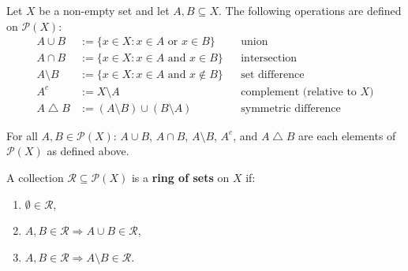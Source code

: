
\begin{tcolorbox}[colback=propbox, colframe=propborder, arc=2pt,
  left=6pt, right=6pt, top=4pt, bottom=4pt,
  title={\small\textbf{Definition (Set Operations)}},
  fonttitle=\small\bfseries]
\label{def:set-operations}
Let $X$ be a non-empty set and let $A, B \subseteq X$.  The
following operations are defined on $\mathcal{P}(X)$:
\begin{align*}
A \cup B      &:= \{ x \in X : x \in A \text{ or } x \in B \}
  && \text{union} \\
A \cap B      &:= \{ x \in X : x \in A \text{ and } x \in B \}
  && \text{intersection} \\
A \setminus B &:= \{ x \in X : x \in A \text{ and } x \notin B \}
  && \text{set difference} \\
A^c           &:= X \setminus A
  && \text{complement (relative to } X\text{)} \\
A \mathbin{\triangle} B
              &:= (A \setminus B) \cup (B \setminus A)
  && \text{symmetric difference}
\end{align*}
\end{tcolorbox}

\begin{remark*}
For all $A, B \in \mathcal{P}(X)$: $A \cup B$, $A \cap B$,
$A \setminus B$, $A^c$, and $A \mathbin{\triangle} B$ are each
elements of $\mathcal{P}(X)$ as defined above.
\end{remark*}

\begin{remark*}[Flash]
\end{remark*}

\begin{tcolorbox}[colback=propbox, colframe=propborder, arc=2pt,
  left=6pt, right=6pt, top=4pt, bottom=4pt,
  title={\small\textbf{Definition (Ring of Sets)}},
  fonttitle=\small\bfseries]
\label{def:ring-of-sets}
A collection $\mathcal{R} \subseteq \mathcal{P}(X)$ is a
\textbf{ring of sets} on $X$ if:
\begin{enumerate}
  \item[(R1)] $\emptyset \in \mathcal{R}$,
  \item[(R2)] $A, B \in \mathcal{R} \Rightarrow A \cup B \in \mathcal{R}$,
  \item[(R3)] $A, B \in \mathcal{R} \Rightarrow A \setminus B \in \mathcal{R}$.
\end{enumerate}
\end{tcolorbox}

